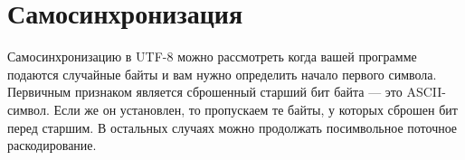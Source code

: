 \documentclass{article}
\begin{document}
\listoftodos
\section{Самосинхронизация}
Самосинхронизацию в
UTF-8 можно рассмотреть когда вашей программе
подаются случайные байты и вам нужно определить начало первого
символа. Первичным признаком является сброшенный старший бит байта
--- это ASCII-символ. Если же он установлен, то пропускаем те
байты, у которых сброшен бит перед
старшим.
В остальных случаях
можно продолжать посимвольное поточное раскодирование.
\end{document}
